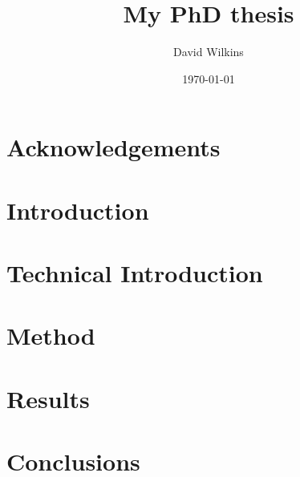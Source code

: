 \documentclass[a4paper]{report}
\begin{document}
\title{My PhD thesis}
\author{David Wilkins}
\date{\today}

\maketitle

\tableofcontents
\listoffigures
\listoftables

\chapter*{Acknowledgements}

\begin{abstract}
\end{abstract}


\chapter{Introduction}
\label{ch:intro}

\chapter{Technical Introduction}
\label{ch:techintro}

\chapter{Method}
\label{ch:method}

\chapter{Results}
\label{ch:results}

\chapter{Conclusions}
\label{ch:conc}



\end{document}
